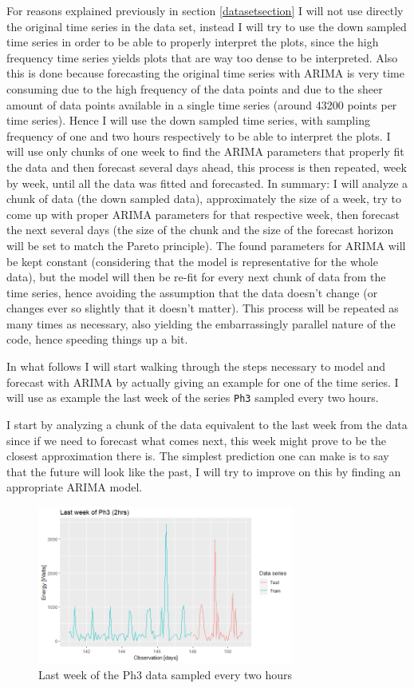 \documentclass[12pt,a4paper,titlepage]{report}
\begin{document}
For reasons explained previously in section \ref{datasetsection} I will not use directly the original time series in the data set, instead I will try to use the down sampled time series in order to be able to properly interpret the plots, since the high frequency time series yields plots that are way too dense to be interpreted. Also this is done because forecasting the original time series with ARIMA is very time consuming due to the high frequency of the data points and due to the sheer amount of data points available in a single time series (around 43200 points per time series). Hence I will use the down sampled time series, with sampling frequency of one and two hours respectively to be able to interpret the plots. I will use only chunks of one week to find the ARIMA parameters that properly fit the data and then forecast several days ahead, this process is then repeated, week by week, until all the data was fitted and forecasted. In summary: I will analyze a chunk of data (the down sampled data), approximately the size of a week, try to come up with proper ARIMA parameters for that respective week, then forecast the next several days (the size of the chunk and the size of the forecast horizon will be set to match the Pareto principle). The found parameters for ARIMA will be kept constant (considering that the model is representative for the whole data), but the model will then be re-fit for every next chunk of data from the time series, hence avoiding the assumption that the data doesn't change (or changes ever so slightly that it doesn't matter). This process will be repeated as many times as necessary, also yielding the embarrassingly parallel nature of the code, hence speeding things up a bit.

In what follows I will start walking through the steps necessary to model and forecast with ARIMA by actually giving an example for one of the time series. I will use as example the last week of the series \texttt{Ph3} sampled every two hours.

I start by analyzing a chunk of the data equivalent to the last week from the data since if we need to forecast what comes next, this week might prove to be the closest approximation there is. The simplest prediction one can make is to say that the future will look like the past, I will try to improve on this by finding an appropriate ARIMA model.

\begin{figure}[h]
    \centering
    \includegraphics[width=0.75\textwidth]{dlastweek2hrsph3}
    \caption{Last week of the Ph3 data sampled every two hours}
    \label{dlastweek2hrsph3}
\end{figure}
\end{document}
